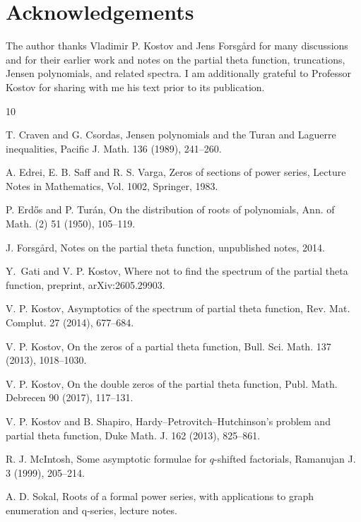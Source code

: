 \documentclass[11pt,a4paper,reqno]{amsart}
\theoremstyle{remark}
\begin{document}
\section*{Acknowledgements}
The author thanks Vladimir P. Kostov and Jens Forsg\aa rd for many discussions and for their earlier work and notes on the partial theta function, truncations, Jensen polynomials, and related spectra. I am additionally grateful to Professor Kostov for sharing with me his text \cite{GatiKostov} prior to its publication.  

\begin{thebibliography}{10}

T. Craven and G. Csordas,
\newblock Jensen polynomials and the Turan and Laguerre inequalities,
\newblock Pacific J. Math. 136 (1989), 241--260.



A. Edrei, E. B. Saff and R. S. Varga,
\newblock Zeros of sections of power series,
\newblock Lecture Notes in Mathematics, Vol. 1002, Springer, 1983.

P. Erd\H{o}s and P. Tur\'an,
\newblock On the distribution of roots of polynomials,
\newblock Ann. of Math. (2) 51 (1950), 105--119.

J. Forsg\aa rd,
\newblock Notes on the partial theta function,
\newblock unpublished notes, 2014.

Y.~Gati and V. P. Kostov,
\newblock Where not to find the spectrum of the partial theta function,
\newblock preprint, arXiv:2605.29903.

V. P. Kostov,
\newblock Asymptotics of the spectrum of partial theta function,
\newblock Rev. Mat. Complut. 27 (2014), 677--684.

V. P. Kostov,
\newblock On the zeros of a partial theta function,
\newblock Bull. Sci. Math. 137 (2013), 1018--1030.

V. P. Kostov,
\newblock On the double zeros of the partial theta function,
\newblock Publ. Math. Debrecen 90 (2017), 117--131.

V. P. Kostov and B. Shapiro,
\newblock Hardy--Petrovitch--Hutchinson's problem and partial theta function,
\newblock Duke Math. J. 162 (2013), 825--861.


R. J. McIntosh,
\newblock Some asymptotic formulae for $q$-shifted factorials,
\newblock Ramanujan J. 3 (1999), 205--214.

A. D. Sokal,
\newblock Roots of a formal power series, with applications to graph enumeration and q-series,
\newblock lecture notes.

\end{thebibliography}
\end{document}
